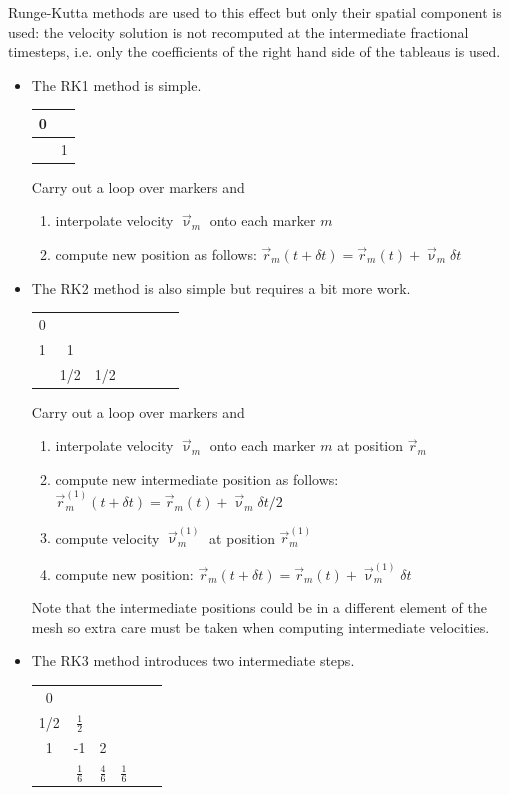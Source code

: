Runge-Kutta methods are used to this effect but only their spatial component is used:
the velocity solution is not recomputed at the intermediate fractional timesteps, i.e. 
only the coefficients of the right hand side of the tableaus is used.

\begin{itemize}
\item The RK1 method is simple.

\begin{tabular}{c|c}
0 & \\
\hline
 & 1
\end{tabular}

\noindent Carry out a loop over markers and 
\begin{enumerate}
\item interpolate velocity $\vec\upnu_{m}$ onto each marker $m$
\item compute new position as follows: $\vec r_m(t+\delta t)=\vec r_m(t) + \vec\upnu_m \delta t$
\end{enumerate}

\item The RK2 method is also simple but requires a bit more work.

\begin{tabular}{c|cccccc}
0 & \\
1 & 1 \\
\hline
 & 1/2 & 1/2 
\end{tabular}

\noindent Carry out a loop over markers and 
\begin{enumerate}
\item interpolate velocity $\vec\upnu_{m}$ onto each marker $m$ at position $\vec r_m$
\item compute new intermediate position as follows: $\vec r_m^{(1)}(t+\delta t)=\vec r_m(t) + \vec\upnu_m \delta t/2$
\item compute velocity $\vec\upnu_{m}^{(1)}$ at position $\vec r_m^{(1)}$
\item compute new position: $\vec r_m(t+\delta t)=\vec r_m(t) + \vec\upnu_m^{(1)} \delta t$ 
\end{enumerate}
Note that the intermediate positions could be in a different element of the mesh so extra 
care must be taken when computing intermediate velocities. 

\item 
The RK3 method introduces two intermediate steps. 

\begin{tabular}{c|ccccc}
0 & \\
1/2 & {\color{chestnut} $\frac{1}{2}$ } \\
1 & {\color{violet}-1} & {\color{violet}2} \\ 
\hline
 & {\color{carrotorange} $\frac16$} & {\color{carrotorange} $\frac46$}  & {\color{carrotorange} $\frac16$}
\end{tabular}


\end{itemize}
